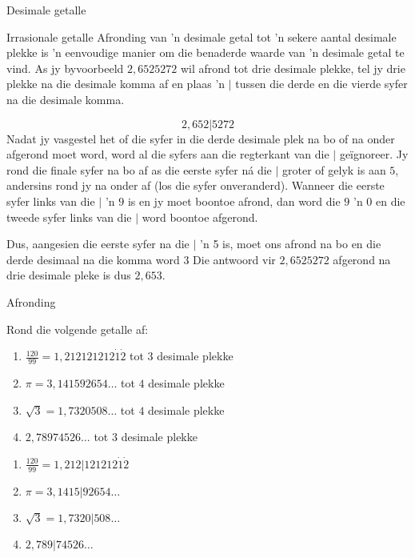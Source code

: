 \begin{Aktiwiteit}{Desimale getalle}
\begin{aktiwiteit}{Irrasionale getalle}
Afronding van ’n desimale getal tot ’n sekere aantal desimale plekke is ’n eenvoudige manier om die benaderde
waarde van ’n desimale getal te vind. As jy byvoorbeeld $2,6525272$ wil afrond tot drie desimale plekke, tel jy drie
plekke na die desimale komma af en plaas ’n $|$ tussen die derde en die vierde syfer na die desimale komma.\par 

\begin{equation*}
2,652|5272
\end{equation*}
Nadat jy vasgestel het of die syfer in die derde desimale plek na bo of na onder afgerond moet word, word al
die syfers aan die regterkant van die $|$ geïgnoreer. Jy rond die finale syfer na bo af as die eerste syfer ná die $|$ groter of gelyk is aan $5$, andersins rond jy na onder af (los die syfer onveranderd). Wanneer die eerste syfer links
van die $|$ 'n $9$ is en jy moet boontoe afrond, dan word die $9$ 'n $0$ en die tweede syfer links van die  $|$ word boontoe afgerond.\par 
Dus, aangesien die eerste syfer na die $|$ 'n 5 is, moet ons afrond na bo en die derde desimaal na die komma word 3 Die antwoord vir $2,6525272$ afgerond na drie desimale pleke is dus $2,653$.
\par


\begin{wex}{Afronding }

{ Rond die volgende getalle af: 
\begin{enumerate}[itemsep=5pt, label=\textbf{\arabic*}. ] 

\item $\frac{120}{99}=1,212121212\dot{1}\dot{2}$ tot $3$ desimale plekke
\item $\pi =3,141592654\ldots$ tot $4$ desimale plekke
\item $\sqrt{3}=1,7320508\ldots$ tot $4$ desimale plekke
\item $2,78974526\ldots$ tot $3$ desimale plekke
\end{enumerate}
}
{


\begin{enumerate}[itemsep=5pt, label=\textbf{\arabic*}. ] 
\item $\frac{120}{99}=1,212|121212\dot{1}\dot{2}$
\item $\pi =3,1415|92654\ldots$
\item $\sqrt{3}=1,7320|508\ldots$
\item $2,789|74526\ldots$
\end{enumerate}

}
\end{wex}
\end{aktiwiteit}
\end{Aktiwiteit}
